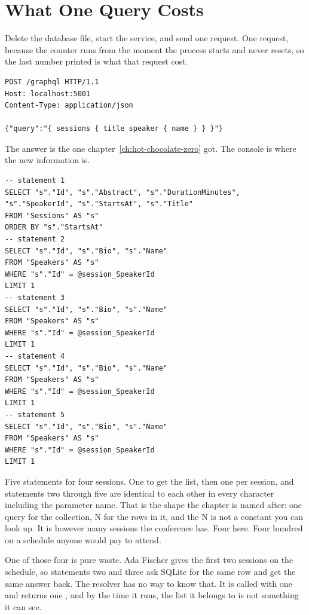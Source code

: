 \section{What One Query Costs}
\label{sec:ch03-what-one-query-costs}

%
Delete the database file, start the service, and send one request. One request,
because the counter runs from the moment the process starts and never resets,
so the last number printed is what that request cost.

\begin{verbatim}
POST /graphql HTTP/1.1
Host: localhost:5001
Content-Type: application/json

{"query":"{ sessions { title speaker { name } } }"}
\end{verbatim}

The answer is the one chapter~\ref{ch:hot-chocolate-zero} got. The console is
where the new information is.

\begin{verbatim}
-- statement 1
SELECT "s"."Id", "s"."Abstract", "s"."DurationMinutes", "s"."SpeakerId", "s"."StartsAt", "s"."Title"
FROM "Sessions" AS "s"
ORDER BY "s"."StartsAt"
-- statement 2
SELECT "s"."Id", "s"."Bio", "s"."Name"
FROM "Speakers" AS "s"
WHERE "s"."Id" = @session_SpeakerId
LIMIT 1
-- statement 3
SELECT "s"."Id", "s"."Bio", "s"."Name"
FROM "Speakers" AS "s"
WHERE "s"."Id" = @session_SpeakerId
LIMIT 1
-- statement 4
SELECT "s"."Id", "s"."Bio", "s"."Name"
FROM "Speakers" AS "s"
WHERE "s"."Id" = @session_SpeakerId
LIMIT 1
-- statement 5
SELECT "s"."Id", "s"."Bio", "s"."Name"
FROM "Speakers" AS "s"
WHERE "s"."Id" = @session_SpeakerId
LIMIT 1
\end{verbatim}

%
Five statements for four sessions. One to get the list, then one per session,
and statements two through five are identical to each other in every character
including the parameter name. That is the shape the chapter is named after:
one query for the collection, N for the rows in it, and the N is not a constant
you can look up. It is however many sessions the conference has. Four here.
Four hundred on a schedule anyone would pay to attend.

%
One of those four is pure waste. Ada Fischer gives the first two sessions on
the schedule, so statements two and three ask SQLite for the same row and get
the same answer back. The resolver has no way to know that. It is called with
one  and returns one , and by the time it runs, the
list it belongs to is not something it can see.

